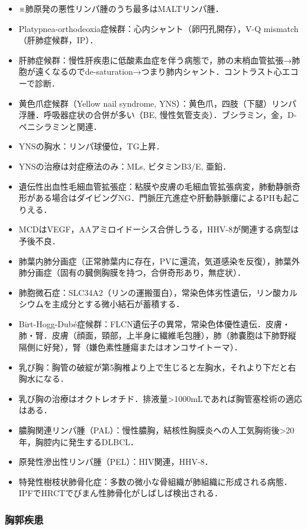 \begin{itemize}
\item ※肺原発の悪性リンパ腫のうち最多はMALTリンパ腫．
\item Platypnea-orthodeoxia症候群：心内シャント（卵円孔開存），V-Q mismatch（肝肺症候群，IP）．
\item 肝肺症候群：慢性肝疾患に低酸素血症を伴う病態で，肺の末梢血管拡張→肺胞が遠くなるのでde-saturation→つまり肺内シャント．コントラスト心エコーで診断．
\item 黄色爪症候群（Yellow nail syndrome, YNS）：黄色爪，四肢（下腿）リンパ浮腫．呼吸器症状の合併が多い（BE, 慢性気管支炎）．ブシラミン，金，D-ペニシラミンと関連．
\item YNSの胸水：リンパ球優位，TG上昇．
\item YNSの治療は対症療法のみ：MLs, ビタミンB3/E, 亜鉛．
\item 遺伝性出血性毛細血管拡張症：粘膜や皮膚の毛細血管拡張病変，肺動静脈奇形がある場合はダイビングNG．門脈圧亢進症や肝動静脈瘻によるPHも起こりえる．
\item MCDはVEGF，AAアミロイドーシス合併しうる，HHV-8が関連する病型は予後不良．
\item 肺葉内肺分画症（正常肺葉内に存在，PVに還流，気道感染を反復），肺葉外肺分画症（固有の臓側胸膜を持つ，合併奇形あり，無症状）．
\item 肺胞微石症：SLC34A2（リンの運搬蛋白），常染色体劣性遺伝，リン酸カルシウムを主成分とする微小結石が蓄積する．
\item Birt-Hogg-Dubé症候群：FLCN遺伝子の異常，常染色体優性遺伝．皮膚・肺・腎．皮膚（顔面，頸部，上半身に繊維毛包腫），肺（肺嚢胞は下肺野縦隔側に好発），腎（嫌色素性腫瘍またはオンコサイトーマ）．
\item 乳び胸：胸管の破綻が第5胸椎より上で生じると左胸水，それより下だと右胸水になる．
\item 乳び胸の治療はオクトレオチド．排液量>1000mLであれば胸管塞栓術の適応はある．
\item 膿胸関連リンパ腫（PAL）：慢性膿胸，結核性胸膜炎への人工気胸術後>20年，胸腔内に発生するDLBCL．
\item 原発性滲出性リンパ腫（PEL）：HIV関連，HHV-8．
\item 特発性樹枝状肺骨化症：多数の微小な骨組織が肺組織に形成される病態．IPFでHRCTでびまん性肺骨化がしばしば検出される．
\end{itemize}


\subsubsection{胸郭疾患}

